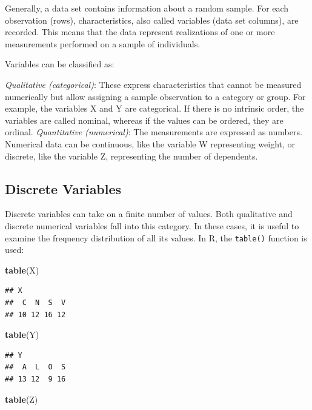 \documentclass[
]{article}
\newenvironment{Shaded}{\begin{snugshade}}{\end{snugshade}}
\newcommand{\FunctionTok}[1]{\textcolor[rgb]{0.13,0.29,0.53}{\textbf{#1}}}
\newcommand{\NormalTok}[1]{#1}
\begin{document}
Generally, a data set contains information about a random sample. For
each observation (rows), characteristics, also called variables (data
set columns), are recorded. This means that the data represent
realizations of one or more measurements performed on a sample of
individuals.

Variables can be classified as:

\emph{Qualitative (categorical)}: These express characteristics that
cannot be measured numerically but allow assigning a sample observation
to a category or group. For example, the variables X and Y are
categorical. If there is no intrinsic order, the variables are called
nominal, whereas if the values can be ordered, they are ordinal.
\emph{Quantitative (numerical)}: The measurements are expressed as
numbers. Numerical data can be continuous, like the variable W
representing weight, or discrete, like the variable Z, representing the
number of dependents.

\hypertarget{discrete-variables}{%
\subsection{Discrete Variables}\label{discrete-variables}}

Discrete variables can take on a finite number of values. Both
qualitative and discrete numerical variables fall into this category. In
these cases, it is useful to examine the frequency distribution of all
its values. In R, the \texttt{table()} function is used:

\begin{Shaded}
\begin{Highlighting}[]
\FunctionTok{table}\NormalTok{(X)}
\end{Highlighting}
\end{Shaded}

\begin{verbatim}
## X
##  C  N  S  V 
## 10 12 16 12
\end{verbatim}

\begin{Shaded}
\begin{Highlighting}[]
\FunctionTok{table}\NormalTok{(Y)}
\end{Highlighting}
\end{Shaded}

\begin{verbatim}
## Y
##  A  L  O  S 
## 13 12  9 16
\end{verbatim}

\begin{Shaded}
\begin{Highlighting}[]
\FunctionTok{table}\NormalTok{(Z)}
\end{Highlighting}
\end{Shaded}
\end{document}

